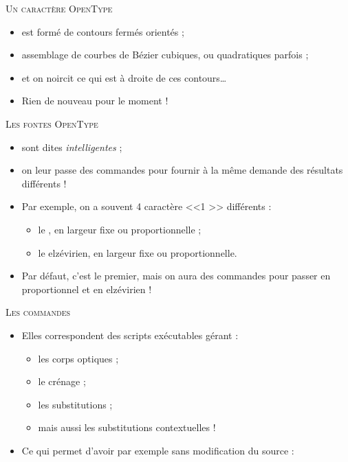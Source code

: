 \documentclass[12pt,a4paper,twocolumn]{book} %
\def\ogla{{\fontfamily{fi4}\selectfont<<}}
\def\fgla{{\fontfamily{fi4}\selectfont>>}}
\begin{document}
{	                                  {\textsc{Un caractère OpenType}}
		                          \begin{itemize}
			                  \item est formé de contours fermés orientés ;
			                  \item assemblage de courbes de Bézier cubiques, ou quadratiques parfois ;
			                  \item et on noircit ce qui est à droite de ces contours\dots
			                  \item Rien de nouveau pour le moment !
		                          \end{itemize}	
		                          
		                          
		                          
		                          
                                          {\textsc{Les fontes OpenType}}
		                          \begin{itemize}
			                  \item sont dites \textit{intelligentes} ;
			                  \item on leur passe des commandes pour fournir à la même demande des résultats différents !
			                  \item Par exemple, on a souvent 4 caractère \ogla 1 \fgla{} différents :
			                    \begin{itemize}
				            \item le {}, en largeur fixe ou proportionnelle ;
				            \item le {\selectfont {}} elzévirien, en largeur fixe ou proportionnelle.
			                    \end{itemize}
			                  \item Par défaut, c'est le premier, mais on aura des commandes pour passer en proportionnel et en elzévirien !
		                          \end{itemize}
		                          
				          
		                          
		                          
		                          {\textsc{Les commandes}}
			                  \begin{itemize}
				          \item  Elles correspondent des scripts exécutables gérant :
				            \begin{itemize}
					    \item les corps optiques ;
					    \item le crénage ;
					    \item les substitutions ;
					    \item mais aussi les substitutions contextuelles !
				            \end{itemize}
				          \item  Ce qui permet d'avoir par exemple sans modification du source :
				            

\end{itemize}}
\end{document}
